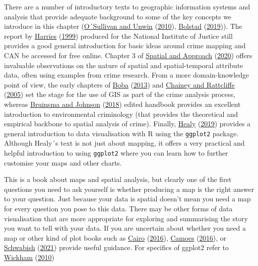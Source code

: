 \documentclass[
]{book}
\begin{document}
There are a number of introductory texts to geographic information systems and analysis that provide adequate background to some of the key concepts we introduce in this chapter (\protect\hyperlink{ref-OSullivan_2010}{O´Sullivan and Unwin} (\protect\hyperlink{ref-OSullivan_2010}{2010}), \protect\hyperlink{ref-Bolstad_2019}{Bolstad} (\protect\hyperlink{ref-Bolstad_2019}{2019})). The report by \protect\hyperlink{ref-Harries_1999}{Harries} (\protect\hyperlink{ref-Harries_1999}{1999}) produced for the National Institute of Justice still provides a good general introduction for basic ideas around crime mapping and CAN be accessed for free online. Chapter 3 of \protect\hyperlink{ref-Haining_2020}{Spatial and Approach} (\protect\hyperlink{ref-Haining_2020}{2020}) offers invaluable observations on the nature of spatial and spatial-temporal attribute data, often using examples from crime research. From a more domain-knowledge point of view, the early chapters of \protect\hyperlink{ref-Boba_2013}{Boba} (\protect\hyperlink{ref-Boba_2013}{2013}) and \protect\hyperlink{ref-Chainey_2005}{Chainey and Rattcliffe} (\protect\hyperlink{ref-Chainey_2005}{2005}) set the stage for the use of GIS as part of the crime analysis process, whereas \protect\hyperlink{ref-Bruinsma_2018}{Bruinsma and Johnson} (\protect\hyperlink{ref-Bruinsma_2018}{2018}) edited handbook provides an excellent introduction to environmental criminology (that provides the theoretical and empirical backbone to spatial analysis of crime). Finally, \protect\hyperlink{ref-Healy_2019}{Healy} (\protect\hyperlink{ref-Healy_2019}{2019}) provides a general introduction to data visualisation with R using the \texttt{ggplot2} package. Although Healy´s text is not just about mapping, it offers a very practical and helpful introduction to using \texttt{ggplot2} where you can learn how to further customise your maps and other charts.

This is a book about maps and spatial analysis, but clearly one of the first questions you need to ask yourself is whether producing a map is the right answer to your question. Just because your data is spatial doesn't mean you need a map for every question you pose to this data. There may be other forms of data visualisation that are more appropriate for exploring and summarising the story you want to tell with your data. If you are uncertain about whether you need a map or other kind of plot books such as \protect\hyperlink{ref-Cairo_2016}{Cairo} (\protect\hyperlink{ref-Cairo_2016}{2016}), \protect\hyperlink{ref-Camoes_2016}{Camoes} (\protect\hyperlink{ref-Camoes_2016}{2016}), or \protect\hyperlink{ref-Schwabish_2021}{Schwabish} (\protect\hyperlink{ref-Schwabish_2021}{2021}) provide useful guidance. For specifics of ggplot2 refer to \protect\hyperlink{ref-Wickham_2010}{Wickham} (\protect\hyperlink{ref-Wickham_2010}{2010})
\end{document}
